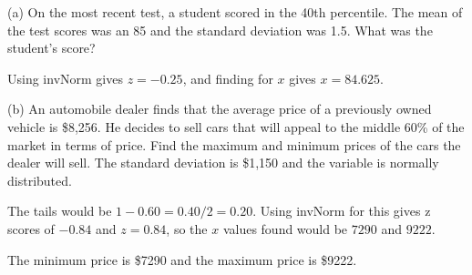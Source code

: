 \documentclass[../stats.tex]{subfiles}
\begin{document}
\begin{example}
    (a) On the most recent test, a student scored in the 40th percentile. The mean of the test scores was an 85 and the standard deviation was 1.5. What was the student's score?

    Using invNorm gives $z=-0.25$, and finding for $x$ gives $x=84.625$.

    (b) An automobile dealer finds that the average price of a previously owned vehicle is \$8,256. He decides to sell cars that will appeal to the 
    middle 60\% of the market in terms of price. Find the maximum and minimum prices of the cars the dealer will sell.
    The standard deviation is \$1,150 and the variable is normally distributed.
    
    The tails would be $1-0.60=0.40/2 = 0.20$. Using invNorm for this gives z scores of $-0.84$ and $z=0.84$, so the $x$ values found would be $7290$ and $9222$.

    The minimum price is \$7290 and the maximum price is \$9222.
\end{example}
\end{document}
